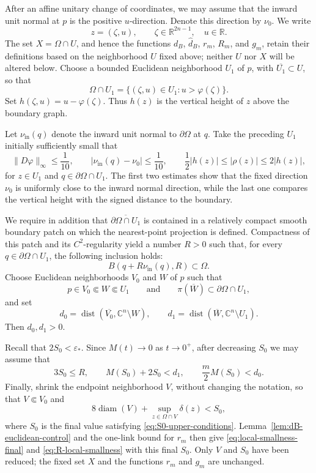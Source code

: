 \documentclass[11pt]{article}
\theoremstyle{definition}
\newcommand{\C}{\mathbb{C}}
\newcommand{\R}{\mathbb{R}}
\newcommand{\dist}{\operatorname{dist}}
\newcommand{\eps}{\varepsilon}
\begin{document}
After an affine unitary change of coordinates, we may assume that the
inward unit normal at \(p\) is the positive \(u\)-direction.  Denote
this direction by \(\nu_0\).  We write
\[
z=(\zeta,u),
\qquad
\zeta\in\R^{2n-1},
\quad
u\in\R.
\]
The set \(X=\Omega\cap U\), and hence the functions
\(d_B\), \(\widehat d_B\), \(r_m\), \(R_m\), and \(g_m\), retain their
definitions based on the neighborhood \(U\) fixed above; neither \(U\)
nor \(X\) will be altered below.  Choose a
bounded Euclidean neighborhood \(U_1\) of \(p\), with
\(\overline{U_1}\subset U\), so that
\[
\Omega\cap U_1
=
\{(\zeta,u)\in U_1:u>\varphi(\zeta)\}.
\]
Set \(h(\zeta,u)=u-\varphi(\zeta)\).
Thus \(h(z)\) is the vertical height of \(z\) above the boundary graph.

Let \(\nu_{\mathrm{in}}(q)\) denote the inward unit normal to
\(\partial\Omega\) at \(q\).  Take the preceding \(U_1\) initially
sufficiently small that
\begin{equation}\label{eq:graph-comparison}
\|D\varphi\|_\infty\le\frac1{10},
\qquad
|\nu_{\mathrm{in}}(q)-\nu_0|\le\frac1{10},
\qquad
\frac12 |h(z)|
\le
|\rho(z)|
\le
2|h(z)|,
\end{equation}
for \(z\in U_1\) and \(q\in\partial\Omega\cap U_1\).
The first two estimates show that the fixed direction \(\nu_0\) is
uniformly close to the inward normal direction, while the last one
compares the vertical height with the signed distance to the boundary.

We require in addition that
\(\overline{\partial\Omega\cap U_1}\) is contained in a relatively
compact smooth boundary patch on which the nearest-point projection is
defined.
Compactness of this patch and its \(C^2\)-regularity yield a number \(R>0\)
such that, for every \(q\in\partial\Omega\cap U_1\), the following
inclusion holds:
\begin{equation*}
	B(q+R\nu_{\mathrm{in}}(q),R)
	\subset\Omega.
\end{equation*}
Choose Euclidean neighborhoods \(V_0\) and \(W\) of \(p\) such that
\[
p\in V_0\Subset W\Subset U_1
\qquad\text{and}\qquad
\pi(\overline W)\subset\partial\Omega\cap U_1,
\]
and set
\[
d_0
=
\dist(\overline{V_0},\C^n\setminus W),
\qquad
d_1
=
\dist(\overline W,\C^n\setminus U_1).
\]
Then \(d_0,d_1>0\).

Recall that \(2S_0<\eps_*\).  Since
\(M(t)\to0\) as \(t\to0^+\), after decreasing \(S_0\) we may
assume that
\begin{equation}\label{eq:S0-upper-conditions}
	3S_0\le R,
	\qquad
	M(S_0)+2S_0<d_1,
	\qquad
	\frac m2M(S_0)<d_0.
\end{equation}
Finally, shrink the endpoint neighborhood \(V\), without changing
the notation, so that \(V\Subset V_0\) and
\[
8\operatorname{diam}(V)
+\sup_{z\in\Omega\cap V}\delta(z)<S_0,
\]
where \(S_0\) is the final value satisfying
\eqref{eq:S0-upper-conditions}.
Lemma~\ref{lem:dB-euclidean-control} and the one-link bound for \(r_m\)
then give \eqref{eq:local-smallness-final} and
\eqref{eq:R-local-smallness} with this final \(S_0\).
Only \(V\) and \(S_0\) have been reduced; the fixed set \(X\) and the
functions \(r_m\) and \(g_m\) are unchanged.
\end{document}
